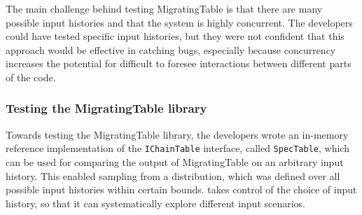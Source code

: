 


The main challenge behind testing MigratingTable is that there are many possible input histories and that the system is highly concurrent. The developers could have tested specific input histories, but they were not confident that this approach would be effective in catching bugs, especially because concurrency increases the potential for difficult to foresee interactions between different parts of the code.

\subsubsection{Testing the MigratingTable library}

Towards testing the MigratingTable library, the developers wrote an in-memory reference implementation of the \texttt{IChainTable} interface, called \texttt{SpecTable}, which can be used for comparing the output of MigratingTable on an arbitrary input history. This enabled sampling from a distribution, which was defined over all possible input histories within certain bounds. \psharp takes control of the choice of input history, so that it can systematically explore different input scenarios.


